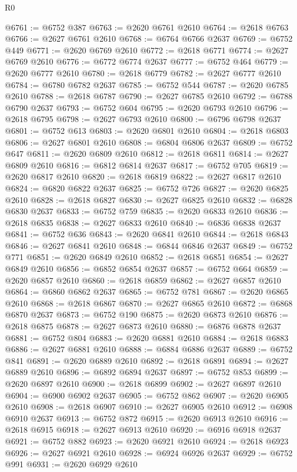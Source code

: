 \begin{lexlean}{R0}
\begin{coremodule}
@6761 := @6752 @387
@6763 := @2620 @6761 @2610
@6764 := @2618 @6763
@6766 := @2627 @6761 @2610
@6768 := @6764 @6766 @2637
@6769 := @6752 @449
@6771 := @2620 @6769 @2610
@6772 := @2618 @6771
@6774 := @2627 @6769 @2610
@6776 := @6772 @6774 @2637
@6777 := @6752 @464
@6779 := @2620 @6777 @2610
@6780 := @2618 @6779
@6782 := @2627 @6777 @2610
@6784 := @6780 @6782 @2637
@6785 := @6752 @544
@6787 := @2620 @6785 @2610
@6788 := @2618 @6787
@6790 := @2627 @6785 @2610
@6792 := @6788 @6790 @2637
@6793 := @6752 @604
@6795 := @2620 @6793 @2610
@6796 := @2618 @6795
@6798 := @2627 @6793 @2610
@6800 := @6796 @6798 @2637
@6801 := @6752 @613
@6803 := @2620 @6801 @2610
@6804 := @2618 @6803
@6806 := @2627 @6801 @2610
@6808 := @6804 @6806 @2637
@6809 := @6752 @647
@6811 := @2620 @6809 @2610
@6812 := @2618 @6811
@6814 := @2627 @6809 @2610
@6816 := @6812 @6814 @2637
@6817 := @6752 @705
@6819 := @2620 @6817 @2610
@6820 := @2618 @6819
@6822 := @2627 @6817 @2610
@6824 := @6820 @6822 @2637
@6825 := @6752 @726
@6827 := @2620 @6825 @2610
@6828 := @2618 @6827
@6830 := @2627 @6825 @2610
@6832 := @6828 @6830 @2637
@6833 := @6752 @759
@6835 := @2620 @6833 @2610
@6836 := @2618 @6835
@6838 := @2627 @6833 @2610
@6840 := @6836 @6838 @2637
@6841 := @6752 @636
@6843 := @2620 @6841 @2610
@6844 := @2618 @6843
@6846 := @2627 @6841 @2610
@6848 := @6844 @6846 @2637
@6849 := @6752 @771
@6851 := @2620 @6849 @2610
@6852 := @2618 @6851
@6854 := @2627 @6849 @2610
@6856 := @6852 @6854 @2637
@6857 := @6752 @664
@6859 := @2620 @6857 @2610
@6860 := @2618 @6859
@6862 := @2627 @6857 @2610
@6864 := @6860 @6862 @2637
@6865 := @6752 @781
@6867 := @2620 @6865 @2610
@6868 := @2618 @6867
@6870 := @2627 @6865 @2610
@6872 := @6868 @6870 @2637
@6873 := @6752 @190
@6875 := @2620 @6873 @2610
@6876 := @2618 @6875
@6878 := @2627 @6873 @2610
@6880 := @6876 @6878 @2637
@6881 := @6752 @804
@6883 := @2620 @6881 @2610
@6884 := @2618 @6883
@6886 := @2627 @6881 @2610
@6888 := @6884 @6886 @2637
@6889 := @6752 @841
@6891 := @2620 @6889 @2610
@6892 := @2618 @6891
@6894 := @2627 @6889 @2610
@6896 := @6892 @6894 @2637
@6897 := @6752 @853
@6899 := @2620 @6897 @2610
@6900 := @2618 @6899
@6902 := @2627 @6897 @2610
@6904 := @6900 @6902 @2637
@6905 := @6752 @862
@6907 := @2620 @6905 @2610
@6908 := @2618 @6907
@6910 := @2627 @6905 @2610
@6912 := @6908 @6910 @2637
@6913 := @6752 @872
@6915 := @2620 @6913 @2610
@6916 := @2618 @6915
@6918 := @2627 @6913 @2610
@6920 := @6916 @6918 @2637
@6921 := @6752 @882
@6923 := @2620 @6921 @2610
@6924 := @2618 @6923
@6926 := @2627 @6921 @2610
@6928 := @6924 @6926 @2637
@6929 := @6752 @991
@6931 := @2620 @6929 @2610

\end{coremodule}
\end{lexlean}

